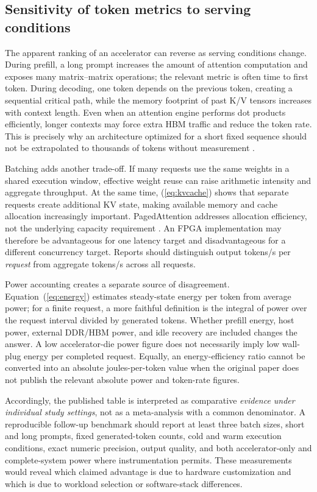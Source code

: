\documentclass[conference,10pt]{IEEEtran}
\begin{document}
\subsection{Sensitivity of token metrics to serving conditions}
The apparent ranking of an accelerator can reverse as serving conditions change. During prefill, a long prompt increases the amount of attention computation and exposes many matrix--matrix operations; the relevant metric is often time to first token. During decoding, one token depends on the previous token, creating a sequential critical path, while the memory footprint of past K/V tensors increases with context length. Even when an attention engine performs dot products efficiently, longer contexts may force extra HBM traffic and reduce the token rate. This is precisely why an architecture optimized for a short fixed sequence should not be extrapolated to thousands of tokens without measurement \cite{shazeer2019,ainslie2023}.

Batching adds another trade-off. If many requests use the same weights in a shared execution window, effective weight reuse can raise arithmetic intensity and aggregate throughput. At the same time, (\ref{eq:kvcache}) shows that separate requests create additional KV state, making available memory and cache allocation increasingly important. PagedAttention addresses allocation efficiency, not the underlying capacity requirement \cite{kwon2023}. An FPGA implementation may therefore be advantageous for one latency target and disadvantageous for a different concurrency target. Reports should distinguish output tokens/s per \emph{request} from aggregate tokens/s across all requests.

Power accounting creates a separate source of disagreement. Equation~(\ref{eq:energy}) estimates steady-state energy per token from average power; for a finite request, a more faithful definition is the integral of power over the request interval divided by generated tokens. Whether prefill energy, host power, external DDR/HBM power, and idle recovery are included changes the answer. A low accelerator-die power figure does not necessarily imply low wall-plug energy per completed request. Equally, an energy-efficiency ratio cannot be converted into an absolute joules-per-token value when the original paper does not publish the relevant absolute power and token-rate figures.

Accordingly, the published table is interpreted as comparative \emph{evidence under individual study settings}, not as a meta-analysis with a common denominator. A reproducible follow-up benchmark should report at least three batch sizes, short and long prompts, fixed generated-token counts, cold and warm execution conditions, exact numeric precision, output quality, and both accelerator-only and complete-system power where instrumentation permits. These measurements would reveal which claimed advantage is due to hardware customization and which is due to workload selection or software-stack differences.
\end{document}
